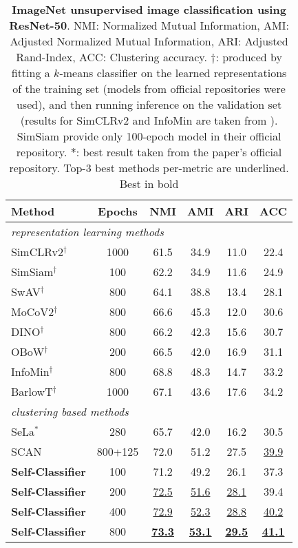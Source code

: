 \documentclass[runningheads]{llncs}
\begin{document}
\begin{table}[bt]
  \centering
  \setlength\tabcolsep{4pt}
    \caption{\textbf{ImageNet unsupervised image classification using ResNet-50}. NMI: Normalized Mutual Information, AMI: Adjusted Normalized Mutual Information, ARI: Adjusted Rand-Index, ACC: Clustering accuracy. ${\dagger}$: produced by fitting a $k$-means classifier on the learned representations of the training set (models from official repositories were used), and then running inference on the validation set (results for SimCLRv2 and InfoMin are taken from \cite{zheltonozhskii2020self}). SimSiam provide only 100-epoch model in their official repository. ${*}$: best result taken from the paper’s official repository. Top-3 best methods per-metric are underlined. Best in bold}
  \label{table:unsupervised_image_classification}
  \begin{tabular}{lccccc}
    \toprule
    Method & Epochs & NMI & AMI & ARI & ACC \\
    \midrule
    \multicolumn{6}{l}{\textit{representation learning methods}}\\
    SimCLRv2$^{\dagger}$ \cite{chen2020big} & 1000 & 61.5 & 34.9 & 11.0 & 22.4 \\
    SimSiam$^{\dagger}$ \cite{chen2021exploring} & 100 & 62.2 & 34.9 & 11.6 & 24.9 \\
    SwAV$^{\dagger}$ \cite{caron2020unsupervised} & 800 & 64.1 & 38.8 & 13.4 & 28.1 \\
    MoCoV2$^{\dagger}$ \cite{chen2020improved} & 800 & 66.6 & 45.3 & 12.0 & 30.6 \\
    DINO$^{\dagger}$ \cite{caron2021emerging} & 800 & 66.2 & 42.3 & 15.6 & 30.7 \\
    OBoW$^{\dagger}$ \cite{gidaris2021obow} & 200 & 66.5 & 42.0 & 16.9 & 31.1 \\
    InfoMin$^{\dagger}$ \cite{tian2020makes} & 800 & 68.8 & 48.3 & 14.7 & 33.2  \\
    BarlowT$^{\dagger}$ \cite{DBLP:conf/icml/ZbontarJMLD21} & 1000 & 67.1 & 43.6 & 17.6 & 34.2 \\
    \midrule
    \midrule
    \multicolumn{6}{l}{\textit{clustering based methods}}\\
    SeLa${^*}$ \cite{YM.2020Self-labelling} & 280 & 65.7 & 42.0 & 16.2 & 30.5 \\
    SCAN \cite{van2020scan} & 800+125 & 72.0 & 51.2 & 27.5 & \underline{39.9} \\
    \midrule
    \textbf{Self-Classifier} & 100 & 71.2 & 49.2 & 26.1 & 37.3 \\
    \textbf{Self-Classifier} & 200 & \underline{72.5} & \underline{51.6} & \underline{28.1} & 39.4 \\
    \textbf{Self-Classifier} & 400 & \underline{72.9} & \underline{52.3} & \underline{28.8} & \underline{40.2} \\
    \textbf{Self-Classifier} & 800 & \underline{\textbf{73.3}} & \underline{\textbf{53.1}} & \underline{\textbf{29.5}} & \underline{\textbf{41.1}} \\
    \bottomrule
  \end{tabular}
\end{table}
\end{document}
